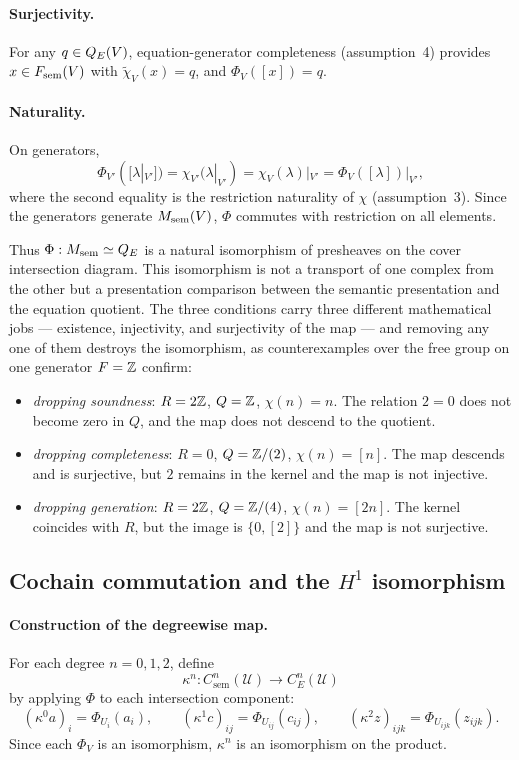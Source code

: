 \paragraph{Surjectivity.}
For any $q\in Q_{E}(V)$, equation-generator completeness (assumption~4)
provides $x\in F_{\mathrm{sem}}(V)$ with $\widetilde\chi_V(x)=q$, and
$\Phi_V([x])=q$.

\paragraph{Naturality.}
On generators,
\[
\Phi_{V'}([\lambda|_{V'}])
  =\chi_{V'}(\lambda|_{V'})
  =\chi_V(\lambda)|_{V'}
  =\Phi_V([\lambda])|_{V'},
\]
where the second equality is the restriction naturality of $\chi$
(assumption~3). Since the generators generate $M_{\mathrm{sem}}(V)$, $\Phi$
commutes with restriction on all elements.

Thus $\Phi:M_{\mathrm{sem}}\simeq Q_{E}$ is a natural isomorphism of presheaves on
the cover intersection diagram. This isomorphism is not a transport of
one complex from the other but a presentation comparison between the
semantic presentation and the equation quotient. The three conditions
carry three different mathematical jobs --- existence, injectivity, and
surjectivity of the map --- and removing any one of them destroys the
isomorphism, as counterexamples over the free group on one generator
$F=\mathbb{Z}$ confirm:
\begin{itemize}
\item \emph{dropping soundness}: $R=2\mathbb{Z}$, $Q=\mathbb{Z}$, $\chi(n)=n$.
The relation $2=0$ does not become zero in $Q$, and the map does not
descend to the quotient.
\item \emph{dropping completeness}: $R=0$, $Q=\mathbb{Z}/(2)$,
$\chi(n)=[n]$. The map descends and is surjective, but $2$ remains in
the kernel and the map is not injective.
\item \emph{dropping generation}: $R=2\mathbb{Z}$, $Q=\mathbb{Z}/(4)$,
$\chi(n)=[2n]$. The kernel coincides with $R$, but the image is
$\{0,[2]\}$ and the map is not surjective.
\end{itemize}

\subsection{Cochain commutation and the \texorpdfstring{$H^1$}{H1} isomorphism}\label{sec:54}

\paragraph{Construction of the degreewise map.}
For each degree $n=0,1,2$, define
\[
\kappa^n:C^n_{\mathrm{sem}}(\mathcal U)\longrightarrow C^n_E(\mathcal U)
\]
by applying $\Phi$ to each intersection component:
\[
(\kappa^0a)_i=\Phi_{U_i}(a_i),\qquad
(\kappa^1c)_{ij}=\Phi_{U_{ij}}(c_{ij}),\qquad
(\kappa^2z)_{ijk}=\Phi_{U_{ijk}}(z_{ijk}).
\]
Since each $\Phi_V$ is an isomorphism, $\kappa^n$ is an isomorphism on
the product.

